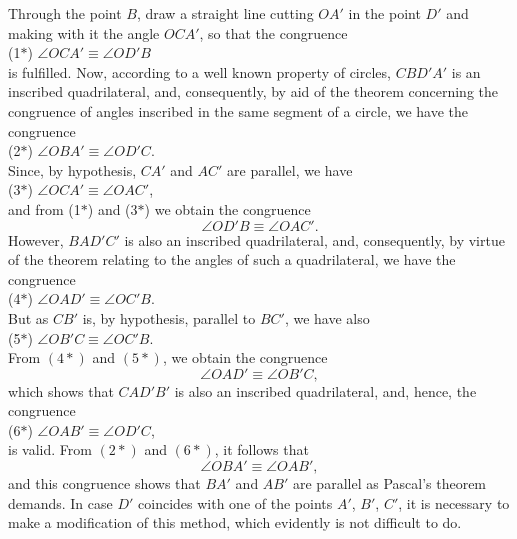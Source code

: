 \documentclass[11pt,oneside]{book}
\begin{document}
Through the point $B$, draw a straight line cutting
$OA'$ in the point $D'$ and making with it the angle
$OCA'$, so that the congruence\\
(1$\ast$)\hspace*{10em} $\angle OCA' \equiv \angle OD'B$\\
is fulfilled. Now, according to a well known property
of circles, $CBD'A'$ is an inscribed quadrilateral, and,
consequently, by aid of the theorem concerning the
congruence of angles inscribed in the same segment
of a circle, we have the congruence\\
(2$\ast$)\hspace*{10em} $\angle OBA' \equiv \angle OD'C$.\\
Since, by hypothesis, $CA'$ and $AC'$ are parallel, we
have\\
(3$\ast$)\hspace*{10em} $\angle OCA' \equiv \angle OAC'$,\\
and from (1$\ast$) and (3$\ast$) we obtain the congruence
\[
\angle OD'B \equiv \angle OAC'.
\]
However, $BAD'C'$ is also an inscribed quadrilateral,
and, consequently, by virtue of the theorem relating
to the angles of such a quadrilateral, we have the congruence\\
(4$\ast$)\hspace*{10em} $\angle OAD' \equiv \angle OC'B$.\\
But as $CB'$ is, by hypothesis, parallel to $BC'$, we
have also\\
\label{folio46}
(5$\ast$)\hspace*{10em}     $\angle OB'C \equiv \angle OC'B$.\\
From $(4\ast)$ and $(5\ast)$, we obtain the congruence
\[
 \angle OAD' \equiv \angle OB'C,
\]
which shows that $CAD'B'$ is also an inscribed quadrilateral,
and, hence, the congruence\\
(6$\ast$)\hspace*{10em}  $\angle OAB' \equiv \angle OD'C$,\\
is valid. From $(2\ast)$ and $(6\ast)$, it follows that
\[
 \angle OBA' \equiv \angle OAB',
\]
and this congruence shows that $BA'$ and $AB'$ are parallel
as Pascal's theorem demands.
In case $D'$ coincides with one of the points $A'$, $B'$,
$C'$, it is necessary to make a modification of this
method, which evidently is not difficult to do.

\label{p15}
\end{document}
